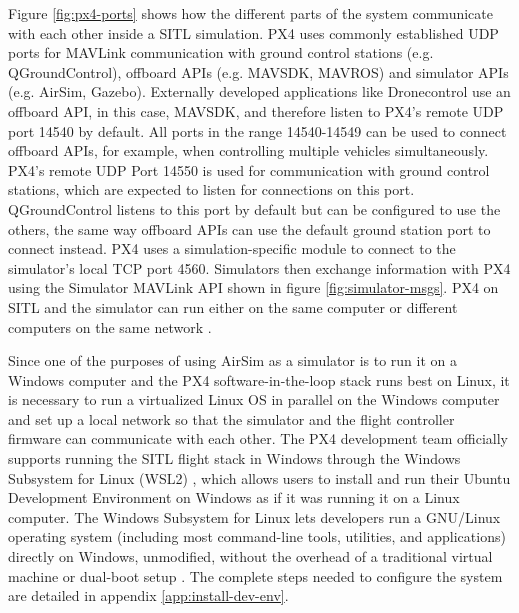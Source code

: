Figure \ref{fig:px4-ports} shows how the different parts of the system communicate with each other inside a SITL simulation.
PX4 uses commonly established UDP ports for MAVLink communication with ground control stations (e.g. QGroundControl), offboard APIs (e.g. MAVSDK, MAVROS) and simulator APIs (e.g. AirSim, Gazebo).
Externally developed applications like Dronecontrol use an offboard API, in this case, MAVSDK, and therefore listen to PX4's remote UDP port 14540 by default.
All ports in the range 14540-14549 can be used to connect offboard APIs, for example, when controlling multiple vehicles simultaneously.
PX4's remote UDP Port 14550 is used for communication with ground control stations, which are expected to listen for connections on this port. QGroundControl listens to this port by default but can be configured to use the others, the same way offboard APIs can use the default ground station port to connect instead.
PX4 uses a simulation-specific module to connect to the simulator's local TCP port 4560.
Simulators then exchange information with PX4 using the Simulator MAVLink API shown in figure \ref{fig:simulator-msgs}. 
PX4 on SITL and the simulator can run either on the same computer or different computers on the same network \cite{px4-simulation}.

Since one of the purposes of using AirSim as a simulator is to run it on a Windows computer and the PX4 software-in-the-loop stack runs best on Linux, it is necessary to run a virtualized Linux OS in parallel on the Windows computer and set up a local network so that the simulator and the flight controller firmware can communicate with each other.
The PX4 development team officially supports running the SITL flight stack in Windows through the Windows Subsystem for Linux (WSL2) \cite{wsl-learn}, which allows users to install and run their Ubuntu Development Environment on Windows as if it was running it on a Linux computer.
The Windows Subsystem for Linux lets developers run a GNU/Linux operating system (including most command-line tools, utilities, and applications) directly on Windows, unmodified, without the overhead of a traditional virtual machine or dual-boot setup \cite{wsl-learn}.
The complete steps needed to configure the system are detailed in appendix \ref{app:install-dev-env}.

